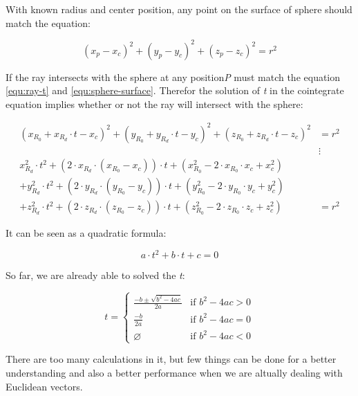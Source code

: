 With known radius and center position, any point on the surface of sphere should match the equation:

\begin{equation}\label{equ:sphere-surface}
(x_{p} - x_{c})^2 + (y_{p} - y_{c})^2 + (z_{p} - z_{c})^2 = r^2
\end{equation}

If the ray intersects with the sphere at any position\emph{P} must match the equation \ref{equ:ray-t} and \ref{equ:sphere-surface}. Therefor the solution of \emph{t} in the cointegrate equation implies whether or not the ray will intersect with the sphere:

\begin{equation}\label{equ:ray-sphere}
\begin{aligned}
(x_{R_{0}} + x_{R_{d}} \cdot t - x_{c})^2 + (y_{R_{0}} + y_{R_{d}} \cdot t - y_{c})^2 + (z_{R_{0}} + z_{R_{d}} \cdot t - z_{c})^2 &= r^2 \\
&\vdots \\
x_{R_{d}}^2 \cdot t^2 + (2 \cdot x_{R_{d}} \cdot (x_{R_{0}} - x_{c})) \cdot t + (x_{R_{0}}^2 - 2 \cdot x_{R_{0}}\cdot x_{c} + x_{c}^2) & \\
+ y_{R_{d}}^2 \cdot t^2 + (2 \cdot y_{R_{d}} \cdot (y_{R_{0}} - y_{c})) \cdot t + (y_{R_{0}}^2 - 2 \cdot y_{R_{0}}\cdot y_{c} + y_{c}^2) & \\
+ z_{R_{d}}^2 \cdot t^2 + (2 \cdot z_{R_{d}} \cdot (z_{R_{0}} - z_{c})) \cdot t + (z_{R_{0}}^2 - 2 \cdot z_{R_{0}}\cdot z_{c} + z_{c}^2) &= r^2
\end{aligned}
\end{equation}

It can be seen as a quadratic formula:

\begin{equation}\label{equ:sphere-surface-quadratic-formula}
a \cdot t^2 + b \cdot t + c = 0
\end{equation}

So far, we are already able to solved the \emph{t}:

\[
t =
\begin{cases}
\frac{-b \pm \sqrt{b^2 - 4ac}}{2a} & \text{if } b^2 - 4ac > 0 \\
\frac{-b}{2a} & \text{if } b^2 - 4ac = 0 \\
\varnothing & \text{if } b^2 - 4ac < 0
\end{cases}
\]

There are too many calculations  in it, but few things can be done for a better understanding and also a better performance when we are altually dealing with Euclidean vectors.


